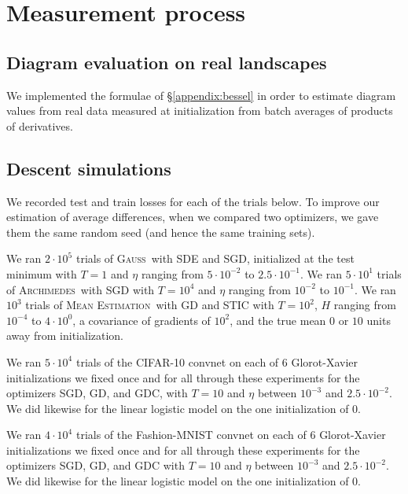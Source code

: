 \documentclass[openany, notitlepage, justified]{tufte-book}
\theoremstyle{plain}
\theoremstyle{definition}
\newcommand{\Gauss}{\textsc{Gauss}}
\newcommand{\Archimedes}{\textsc{Archimedes}}
\newcommand{\MeanEstimation}{\textsc{Mean Estimation}}
\begin{document}
    \section{Measurement process}                                \label{appendix:measure}

        \subsection{Diagram evaluation on real landscapes}
            We implemented the formulae of \S\ref{appendix:bessel} in order
            to estimate diagram values from real data measured at
            initialization from batch averages of products of derivatives.

        \subsection{Descent simulations}
            We recorded test and train losses for each of the trials below.  To
            improve our estimation of average differences, when we compared two
            optimizers, we gave them the same random seed (and hence the same
            training sets).

            We ran $2 \cdot 10^5$ trials of \Gauss\ with SDE and SGD,
            initialized at the test minimum with $T=1$ and $\eta$ ranging from
            $5\cdot 10^{-2}$ to $2.5\cdot 10^{-1}$.
            We ran $5 \cdot 10^1$ trials of \Archimedes\ with SGD with $T=10^4$
            and $\eta$ ranging from $10^{-2}$ to $10^{-1}$.
            We ran $10^3$ trials of \MeanEstimation\ with GD and STIC
            with $T=10^2$, $H$ ranging from $10^{-4}$ to $4 \cdot 10^0$,
            a covariance of gradients of $10^2$, and the true mean $0$ or
            $10$ units away from initialization.

            We ran $5 \cdot 10^4$ trials of the CIFAR-10 convnet on each of $6$
            Glorot-Xavier initializations we fixed once and for all through
            these experiments for the optimizers SGD, GD, and GDC, with $T=10$
            and $\eta$ between $10^{-3}$ and $2.5 \cdot 10^{-2}$.  We did
            likewise for the linear logistic model on the one initialization of
            $0$.

            We ran $4 \cdot 10^4$ trials of the Fashion-MNIST convnet on each
            of $6$ Glorot-Xavier initializations we fixed once and for all
            through these experiments for the optimizers SGD, GD, and GDC with
            $T=10$ and $\eta$ between $10^{-3}$ and $2.5 \cdot 10^{-2}$.  We
            did likewise for the linear logistic model on the one
            initialization of $0$. 
\end{document}
